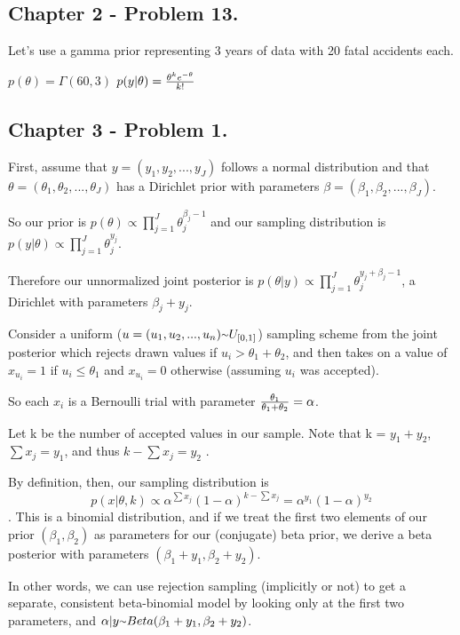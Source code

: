 \documentclass{article}
\newcommand{\mytilde}{\raise.17ex\hbox{$\scriptstyle\mathtt{\sim}$}}
\begin{document}
\subsection{Chapter 2 - Problem 13.}

Let's use a gamma prior representing 3 years of data with 20 fatal accidents each.

\(p(\theta) = \Gamma(60, 3)\)
\(p(y \vert \theta) = {\theta^k e^{-\theta} \over k!}\)

\subsection{Chapter 3 - Problem 1.}

First, assume that \(y = (y_1, y_2, ..., y_J)\) follows a normal distribution and that
 \(\theta = (\theta_1, \theta_2, ..., \theta_J)\) has a Dirichlet prior with parameters
 \(\beta = (\beta_1, \beta_2, ..., \beta_J)\).
 
So our prior is \(p(\theta) \propto \prod_{j=1}^J \theta_j^{\beta_j - 1}\)
 and our sampling distribution is \(p(y \vert \theta) \propto \prod_{j=1}^J \theta_j^{y_j}\).

Therefore our unnormalized joint posterior is
\(p(\theta \vert y) \propto \prod_{j=1}^J \theta_j^{y_j + \beta_j - 1}\),
a Dirichlet with parameters \(\beta_j + y_j\).

Consider a uniform (\(u = (u_1, u_2, ..., u_n) \mytilde U_{[0,1]}\)) 
sampling scheme from the joint posterior 
which rejects drawn values if \(u_i > \theta_1 + \theta_2\),
and then takes on a value of \(x_{u_i} = 1\) if \(u_i \leq \theta_1\) and \(x_{u_i} = 0\) otherwise (assuming \(u_i\) was accepted). 

So each \(x_i\) is a Bernoulli trial with parameter
\({\theta_1 \over \theta_1 + \theta_2} = \alpha\).

Let k be the number of accepted values in our sample. Note that k = \(y_1 + y_2\), 
\(\sum x_j = y_1\), and thus \(k - \sum x_j = y_2\)  . 

By definition, then, our sampling distribution is \[p(x \vert \theta, k) \propto \alpha^{\sum x_j} (1 - \alpha)^{k - \sum x_j} = \alpha^{y_1} (1 - \alpha)^{y_2}\]. This is a binomial distribution,
and if we treat the first two elements of our prior \((\beta_1, \beta_2)\) as parameters for
our (conjugate) beta prior, we derive a beta posterior with parameters 
\((\beta_1 + y_1, \beta_2 + y_2)\).

In other words, we can use rejection sampling (implicitly or not) to get a separate, consistent beta-binomial model by looking only at the first two parameters, and 
\(\alpha \vert y \mytilde Beta(\beta_1 + y_1, \beta_2 + y_2)\).
\end{document}
